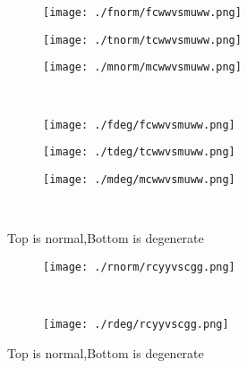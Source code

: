 \documentclass[aps,floats,floatfix,nofootinbib]{revtex4-1}
\begin{document}
\begin{center}
\begin{figure}
\begin{subfigure}{0.3\textwidth}
\texttt{[image: ./fnorm/fcwwvsmuww.png]}
\label{}
\end{subfigure}
\begin{subfigure}{0.3\textwidth}
\texttt{[image: ./tnorm/tcwwvsmuww.png]}
\label{}
\end{subfigure}
\begin{subfigure}{0.3\textwidth}
\texttt{[image: ./mnorm/mcwwvsmuww.png]}
\label{}
\end{subfigure}\\
\begin{subfigure}{0.3\textwidth}
\texttt{[image: ./fdeg/fcwwvsmuww.png]}
\label{}
\end{subfigure}
\begin{subfigure}{0.3\textwidth}
\texttt{[image: ./tdeg/tcwwvsmuww.png]}
\label{}
\end{subfigure}
\begin{subfigure}{0.3\textwidth}
\texttt{[image: ./mdeg/mcwwvsmuww.png]}
\label{}
\end{subfigure}\\
\caption{Top is normal,Bottom is degenerate}
\end{figure}
\end{center}

\begin{center}
\begin{figure}
\begin{subfigure}{1.0\textwidth}
\texttt{[image: ./rnorm/rcyyvscgg.png]}
\label{}
\end{subfigure}\\
\begin{subfigure}{1.0\textwidth}
\texttt{[image: ./rdeg/rcyyvscgg.png]}
\label{}
\end{subfigure}
\caption{Top is normal,Bottom is degenerate}
\end{figure}
\end{center}
\end{document}
